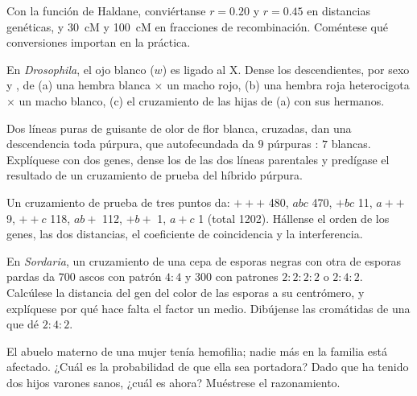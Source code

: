 \begin{exercise}[$\star\star$]\label{exo:b2:meiosis-heredity:7}
Con la función de Haldane, conviértanse $r = 0.20$ y $r = 0.45$ en
distancias genéticas, y \qty{30}{cM} y \qty{100}{cM} en fracciones de
recombinación. Coméntese qué conversiones importan en la práctica.
\end{exercise}

\begin{exercise}[$\star\star$]\label{exo:b2:meiosis-heredity:8}
En \emph{Drosophila}, el ojo blanco ($w$) es  ligado al X. Dense
los descendientes, por sexo y , de (a) una hembra blanca $\times$
un macho rojo, (b) una hembra roja heterocigota $\times$ un macho blanco,
(c) el cruzamiento de las hijas de (a) con sus hermanos.
\end{exercise}

\begin{exercise}[$\star\star$]\label{exo:b2:meiosis-heredity:9}
Dos líneas puras de guisante de olor de flor blanca, cruzadas, dan una
descendencia toda púrpura, que autofecundada da $9$ púrpuras : $7$
blancas. Explíquese con dos genes, dense los  de las dos líneas
parentales y predígase el resultado de un cruzamiento de prueba del
híbrido púrpura.
\end{exercise}

\begin{exercise}[$\star\star\star$]\label{exo:b2:meiosis-heredity:10}
Un cruzamiento de prueba de tres puntos da: $+++$ 480, $abc$ 470, $+bc$ 11,
$a++$ 9, $++c$ 118, $ab+$ 112, $+b+$ 1, $a+c$ 1 (total 1202). Hállense
el orden de los genes, las dos distancias, el coeficiente de coincidencia
y la interferencia.
\end{exercise}

\begin{exercise}[$\star\star\star$]\label{exo:b2:meiosis-heredity:11}
En \emph{Sordaria}, un cruzamiento de una cepa de esporas negras con otra
de esporas pardas da $700$ ascos con patrón $4 : 4$ y $300$ con
patrones $2 : 2 : 2 : 2$ o $2 : 4 : 2$. Calcúlese la distancia del gen
del color de las esporas a su centrómero, y explíquese por qué hace
falta el factor un medio. Dibújense las cromátidas de una  que dé
$2 : 4 : 2$.
\end{exercise}

\begin{exercise}[$\star\star\star$]\label{exo:b2:meiosis-heredity:12}
El abuelo materno de una mujer tenía hemofilia; nadie más en la familia
está afectado. ¿Cuál es la probabilidad de que ella sea portadora? Dado
que ha tenido dos hijos varones sanos, ¿cuál es ahora? Muéstrese el
razonamiento.
\end{exercise}

